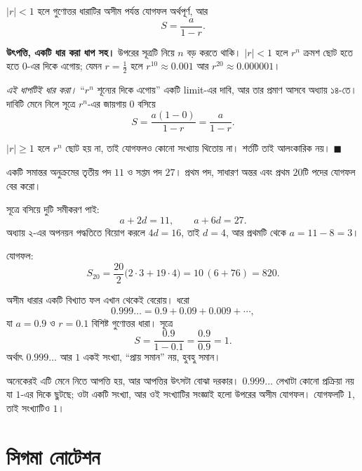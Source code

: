 \documentclass[11pt]{article}
\begin{document}
\begin{idea}[অসীম গুণোত্তর ধারা]
$|r| < 1$ হলে গুণোত্তর ধারাটির অসীম পর্যন্ত যোগফল অর্থপূর্ণ, আর
\[
  S = \frac{a}{1 - r} .
\]
\end{idea}

\noindent
\textbf{উৎপত্তি, একটি ধার করা ধাপ সহ।} উপরের সূত্রটি নিয়ে $n$ বড় করতে থাকি।
$|r| < 1$ হলে $r^{n}$ ক্রমশ ছোট হতে হতে $0$-এর দিকে এগোয়; যেমন
$r = \tfrac{1}{2}$ হলে $r^{10} \approx 0.001$ আর $r^{20} \approx 0.000001$।

\emph{এই ধাপটিই ধার করা।} ``$r^{n}$ শূন্যের দিকে এগোয়'' একটি limit-এর দাবি,
আর তার প্রমাণ আসবে অধ্যায় ১৪-তে। দাবিটি মেনে নিলে সূত্রে $r^{n}$-এর
জায়গায় $0$ বসিয়ে
\[
  S = \frac{a(1-0)}{1-r} = \frac{a}{1-r} .
\]

$|r| \geq 1$ হলে $r^{n}$ ছোট হয় না, তাই যোগফলও কোনো সংখ্যায় থিতোয় না। শর্তটি
তাই আলংকারিক নয়। $\blacksquare$

\begin{example}
একটি সমান্তর অনুক্রমের তৃতীয় পদ $11$ ও সপ্তম পদ $27$। প্রথম পদ, সাধারণ অন্তর
এবং প্রথম $20$টি পদের যোগফল বের করো।
\end{example}

\begin{solbox}
সূত্রে বসিয়ে দুটি সমীকরণ পাই:
\[
  a + 2d = 11 , \qquad a + 6d = 27 .
\]
অধ্যায় ২-এর অপনয়ন পদ্ধতিতে বিয়োগ করলে $4d = 16$, তাই $d = 4$, আর প্রথমটি
থেকে $a = 11 - 8 = 3$।

যোগফল:
\[
  S_{20} = \frac{20}{2}\Big( 2 \cdot 3 + 19 \cdot 4 \Big)
         = 10\,(6 + 76) = 820 .
\]
\end{solbox}

\begin{remark}
অসীম ধারার একটি বিখ্যাত ফল এখান থেকেই বেরোয়। ধরো
\[
  0.999\ldots = 0.9 + 0.09 + 0.009 + \cdots ,
\]
যা $a = 0.9$ ও $r = 0.1$ বিশিষ্ট গুণোত্তর ধারা। সূত্রে
\[
  S = \frac{0.9}{1 - 0.1} = \frac{0.9}{0.9} = 1 .
\]
অর্থাৎ $0.999\ldots$ আর $1$ একই সংখ্যা, ``প্রায় সমান'' নয়, হুবহু সমান।

অনেকেরই এটি মেনে নিতে আপত্তি হয়, আর আপত্তির উৎসটা বোঝা দরকার। $0.999\ldots$
লেখাটা কোনো প্রক্রিয়া নয় যা $1$-এর দিকে ছুটছে; ওটা একটি সংখ্যা, আর ওই সংখ্যাটির
সংজ্ঞাই হলো উপরের অসীম যোগফল। যোগফলটি $1$, তাই সংখ্যাটিও $1$।
\end{remark}

\section{সিগমা নোটেশন}
\end{document}
